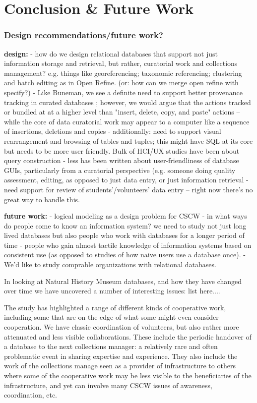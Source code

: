 \section{Conclusion & Future Work}


\subsubsection{Design recommendations/future work?}

\textbf{design: }
- how do we design relational databases that support not just information storage and retrieval, but rather,  curatorial work and collections management? e.g. things like georeferencing; taxonomic referencing; clustering and batch editing as in Open Refine. (or: how can we merge open refine with specify?)
- Like Buneman, we see a definite need to support better provenance tracking in curated databases \cite{Buneman_2006}; however, we would argue that the actions tracked or bundled at at a higher level than "insert, delete, copy, and paste" actions -- while the core of data curatorial work may appear to a computer like a sequence of insertions, deletions and copies
- additionally: need to support visual rearrangement and browsing of tables and tuples; this might have SQL at its core but needs to be more user friendly. Bulk of HCI/UX studies have been about query construction - less has been written about user-friendliness of database GUIs, particularly from a curatorial perspective (e.g. someone doing quality assessment, editing, as opposed to just data entry, or just information retrieval
- need support for review of students'/volunteers' data entry  -- right now there's no great way to handle this.

\textbf{future work:}
- logical modeling as a design problem for CSCW
- in what ways do people come to know an information system? we need to study not just long lived databases but also people who work with databases for a longer period of time - people who gain almost tactile knowledge of information systems based on consistent use (as opposed to studies of how naive users use a database once).
- We'd like to study comprable organizations with relational databases.

In looking at Natural History Museum databases, and how they have changed over time we have uncovered a number of interesting issues:
list here....

The study has highlighted a range of different kinds of cooperative work, including some that are on the edge of what some might even consider cooperation. We have classic coordination of volunteers, but also rather more attenuated and less visible collaborations. These include the periodic handover of a database to the next collections manager: a relatively rare and often problematic event in sharing expertise and experience. They also include the work of the collections manage seen as a provider of infrastructure to others where some of the cooperative work may be less visible to the beneficiaries of the infrastructure, and yet can involve many CSCW issues of awareness, coordination, etc.

